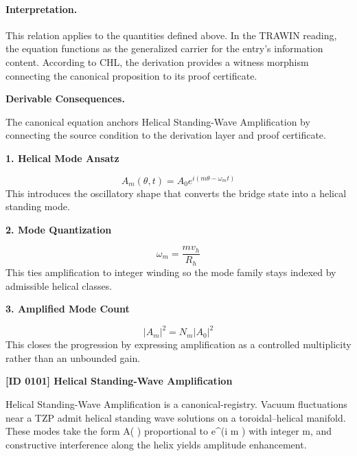 \paragraph{Interpretation.}
This relation applies to the quantities defined above. In the TRAWIN reading, the equation functions as the generalized carrier for the entry’s information content. According to CHL, the derivation provides a witness morphism connecting the canonical proposition to its proof certificate.

\par\vspace{0.35em}
\noindent\textbf{Derivable Consequences.}\quad
\begingroup
\footnotesize
\raggedright
The canonical equation anchors Helical Standing-Wave Amplification by connecting the source condition to the derivation layer and proof certificate.
\par\endgroup

\noindent\textbf{1. Helical Mode Ansatz}\par
\[
A_m(\theta,t)=A_0 e^{i(m\theta-\omega_m t)}
\]
\noindent This introduces the oscillatory shape that converts the bridge state into a helical standing mode.\par
\noindent\textbf{2. Mode Quantization}\par
\[
\omega_m = \frac{m v_h}{R_h}
\]
\noindent This ties amplification to integer winding so the mode family stays indexed by admissible helical classes.\par
\noindent\textbf{3. Amplified Mode Count}\par
\[
\lvert A_m\rvert^2 = N_m \lvert A_0\rvert^2
\]
\noindent This closes the progression by expressing amplification as a controlled multiplicity rather than an unbounded gain.\par

\clearpage
\noindent\textbf{[ID 0101] Helical Standing-Wave Amplification}\par
\vspace{0.35em}
\begingroup\small
{}
Helical Standing-Wave Amplification is a canonical-registry. Vacuum fluctuations near a TZP admit helical standing wave solutions on a toroidal--helical manifold. These modes take the form A( ) proportional to e\textasciicircum{}(i m  ) with integer m, and constructive interference along the helix yields amplitude enhancement.

